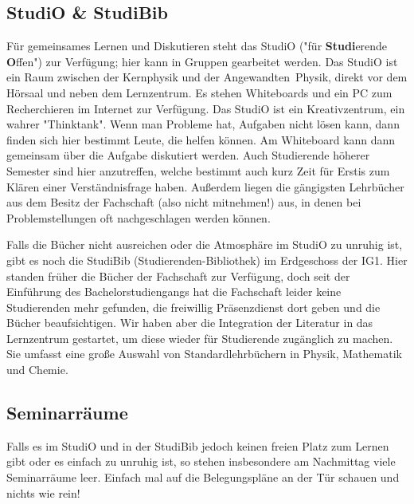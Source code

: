 \begin{multicols*}{2}
\subsection{StudiO \& StudiBib}
Für gemeinsames Lernen und Diskutieren steht das StudiO ("für \textbf{Studi}erende \textbf{O}ffen") zur Verfügung; hier kann in Gruppen gearbeitet werden.
Das StudiO ist ein Raum zwischen der Kernphysik und der Angewandten~Physik, direkt vor dem Hörsaal und neben dem Lernzentrum.
Es stehen Whiteboards und ein PC zum Recherchieren im Internet zur Verfügung.
Das StudiO ist ein Kreativzentrum, ein wahrer "Thinktank".
Wenn man Probleme hat, Aufgaben nicht lösen kann, dann finden sich hier bestimmt Leute, die helfen können.
Am Whiteboard kann dann gemeinsam über die Aufgabe diskutiert werden.
Auch Studierende höherer Semester sind hier anzutreffen, welche bestimmt auch kurz Zeit für Erstis zum Klären einer Verständnisfrage haben.
Außerdem liegen die gängigsten Lehrbücher aus dem Besitz der Fachschaft (also nicht mitnehmen!) aus, in denen bei Problemstellungen oft nachgeschlagen werden können.

Falls die Bücher nicht ausreichen oder die Atmosphäre im StudiO zu unruhig ist, gibt es noch die StudiBib (Studierenden-Bibliothek) im Erdgeschoss der IG1.
Hier standen früher die Bücher der Fachschaft zur Verfügung, doch seit der Einführung des Bachelorstudiengangs hat die Fachschaft leider keine Studierenden mehr gefunden, die freiwillig Präsenzdienst dort geben und die Bücher beaufsichtigen.
Wir haben aber die Integration der Literatur in das Lernzentrum gestartet, um diese wieder für Studierende zugänglich zu machen.
Sie umfasst eine große Auswahl von Standardlehrbüchern in Physik, Mathematik und Chemie.

\subsection{Seminarräume}
Falls es im StudiO und in der StudiBib jedoch keinen freien Platz zum Lernen gibt oder es einfach zu unruhig ist, so stehen insbesondere am Nachmittag viele Seminarräume leer.
Einfach mal auf die Belegungspläne an der Tür schauen und nichts wie rein!


\end{multicols*}
